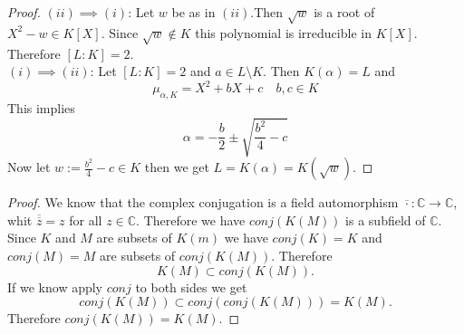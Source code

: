 \begin{proof}
    $(ii)\implies (i)$: Let $w$ be as in $(ii)$.Then $\sqrt{w}$ is a root of $X^2 - w \in K[X]$. Since $\sqrt{w} \notin K$ this polynomial is irreducible in $K[X]$. Therefore $[L:K] = 2$.\\
    $(i)\implies (ii)$: Let $[L:K] = 2$ and $a \in L \setminus K$. Then $K(\alpha) = L$ and 
    $$\mu_{\alpha, K}=X^2 + bX + c \quad b,c \in K$$
    This implies 
    $$\alpha = -\frac{b}{2} \pm \sqrt{\frac{b^2}{4} - c} $$
    Now let $w := \frac{b^2}{4} - c \in K$ then we get $L = K(\alpha) = K(\sqrt{w})$.
\end{proof}

\begin{proof}
    We know that the complex conjugation is a field automorphism $\overline{\cdot }: \mathbb{C} \to \mathbb{C}$, whit $\overline{\overline{z}} = z$ for all $z \in \mathbb{C}$. Therefore we have
    $conj(K(M))$ is a subfield of $\mathbb{C}$.\\
    Since $K$ and $M$ are subsets of $K(m)$ we have $conj(K) = K$ and $conj(M) = M$ are subsets of $conj(K(M))$. Therefore $$K(M) \subset conj(K(M)).$$
    If we know apply $conj$ to both sides we get
    $$conj(K(M)) \subset conj(conj(K(M))) = K(M).$$
    Therefore $conj(K(M)) = K(M)$.
\end{proof}




